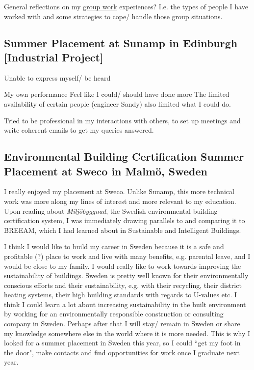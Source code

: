 General reflections on my \underline{group work} experiences?
I.e. the types of people I have worked with and some strategies to cope/ handle those group situations.





\subsection{Summer Placement at Sunamp in Edinburgh [Industrial Project]}

Unable to express myself/ be heard

My own performance
Feel like I could/ should have done more
The limited availability of certain people (engineer Sandy) also limited what I could do.

Tried to be professional in my interactions with others, to set up meetings and write coherent emails to get my queries answered.





\subsection{Environmental Building Certification Summer Placement at Sweco in Malmö, Sweden}

I really enjoyed my placement at Sweco.
Unlike Sunamp, this more technical work was more along my lines of interest and more relevant to my education.
Upon reading about \textit{Miljöbyggnad}, the Swedish environmental building certification system, I was immediately drawing parallels to and comparing it to BREEAM, which I had learned about in Sustainable and Intelligent Buildings.

I think I would like to build my career in Sweden because it is a safe and profitable (?) place to work and live with many benefits, e.g. parental leave, and I would be close to my family.
I would really like to work towards improving the sustainability of buildings.
Sweden is pretty well known for their environmentally conscious efforts and their sustainability, e.g. with their recycling, their district heating systems, their high building standards with regards to U-values etc.
I think I could learn a lot about increasing sustainability in the built environment by working for an environmentally responsible construction or consulting company in Sweden.
Perhaps after that I will stay/ remain in Sweden or share my knowledge somewhere else in the world where it is more needed.
This is why I looked for a summer placement in Sweden this year, so I could ``get my foot in the door", make contacts and find opportunities for work once I graduate next year.

